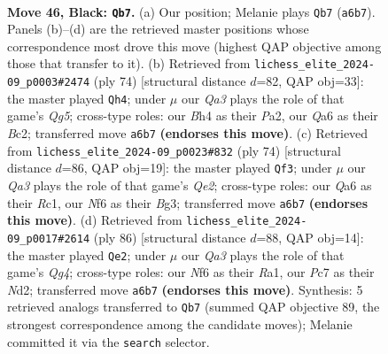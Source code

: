 \documentclass[11pt]{article}
\begin{document}
\begin{figure}[p]
\label{fig:thought-m89}
\end{figure}

\clearpage

\begin{figure}[p]\centering
\begin{subfigure}{0.46\textwidth}\centering
\resizebox{\linewidth}{!}{%
\newchessgame
\chessboard[
  setfen={r1b3k1/p1p2pp1/qp3n2/7p/1P3P1b/B3Q2P/P1B3PK/R7 b - - 0 46},
  showmover=false,
  pgfstyle=straightmove, color=movearrow, markmove={a6-b7}
]}
\caption{}
\end{subfigure}\hfill
\begin{subfigure}{0.46\textwidth}\centering
\resizebox{\linewidth}{!}{%
\newchessgame
\chessboard[
  setfen={2r1bbk1/3q3p/p3pBp1/4P1Q1/2n5/2p2N1R/P1B2PP1/6K1 w - - 2 38},
  showmover=false,
  pgfstyle=straightmove, color=movearrow, markmove={g5-h4}
]}
\caption{}
\end{subfigure}
\\[4pt]
\begin{subfigure}{0.46\textwidth}\centering
\resizebox{\linewidth}{!}{%
\newchessgame
\chessboard[
  setfen={4r3/3q1pk1/3p2b1/2pP2p1/2P5/1Pb3B1/P3QPP1/2R3K1 w - - 5 38},
  showmover=false,
  pgfstyle=straightmove, color=movearrow, markmove={e2-f3}
]}
\caption{}
\end{subfigure}\hfill
\begin{subfigure}{0.46\textwidth}\centering
\resizebox{\linewidth}{!}{%
\newchessgame
\chessboard[
  setfen={r4b1k/2qb2p1/5p1p/p3p3/P1P3Q1/2B1P2P/3N1PP1/R5K1 w - - 15 44},
  showmover=false,
  pgfstyle=straightmove, color=movearrow, markmove={g4-e2}
]}
\caption{}
\end{subfigure}
\caption{\textbf{Move 46, Black: \texttt{Qb7}.} (a) Our position; Melanie plays \texttt{Qb7} (\texttt{a6b7}). Panels (b)--(d) are the retrieved master positions whose correspondence most drove this move (highest QAP objective among those that transfer to it). (b) Retrieved from \texttt{lichess\_elite\_2024-09\_p0003\#2474} (ply 74) [structural distance $d$=82, QAP obj=33]: the master played \texttt{Qh4}; under $\mu$ our \emph{Qa3} plays the role of that game's \emph{Qg5}; cross-type roles: our \emph{B}h4 as their \emph{P}a2, our \emph{Q}a6 as their \emph{B}c2; transferred move \texttt{a6b7} \textbf{(endorses this move)}. (c) Retrieved from \texttt{lichess\_elite\_2024-09\_p0023\#832} (ply 74) [structural distance $d$=86, QAP obj=19]: the master played \texttt{Qf3}; under $\mu$ our \emph{Qa3} plays the role of that game's \emph{Qe2}; cross-type roles: our \emph{Q}a6 as their \emph{R}c1, our \emph{N}f6 as their \emph{B}g3; transferred move \texttt{a6b7} \textbf{(endorses this move)}. (d) Retrieved from \texttt{lichess\_elite\_2024-09\_p0017\#2614} (ply 86) [structural distance $d$=88, QAP obj=14]: the master played \texttt{Qe2}; under $\mu$ our \emph{Qa3} plays the role of that game's \emph{Qg4}; cross-type roles: our \emph{N}f6 as their \emph{R}a1, our \emph{P}c7 as their \emph{N}d2; transferred move \texttt{a6b7} \textbf{(endorses this move)}. Synthesis: 5 retrieved analogs transferred to \texttt{Qb7} (summed QAP objective 89, the strongest correspondence among the candidate moves); Melanie committed it via the \texttt{search} selector.}

\end{figure}
\end{document}
